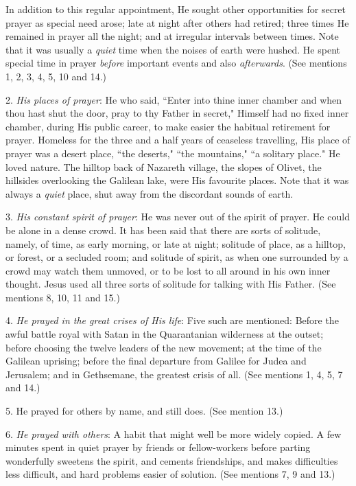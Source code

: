 In addition to this regular appointment, He sought other opportunities for
secret prayer as special need arose; late at night after others had
retired; three times He remained in prayer all the night; and at irregular
intervals between times. Note that it was usually a \textit{quiet} time when the
noises of earth were hushed. He spent special time in prayer \textit{before}
important events and also \textit{afterwards}. (See mentions 1, 2, 3, 4, 5, 10
and 14.)

2. \textit{His places of prayer}: He who said, ``Enter into thine inner chamber
and when thou hast shut the door, pray to thy Father in secret," Himself
had no fixed inner chamber, during His public career, to make easier the
habitual retirement for prayer. Homeless for the three and a half years of
ceaseless travelling, His place of prayer was a desert place, ``the
deserts," ``the mountains," ``a solitary place." He loved nature. The
hilltop back of Nazareth village, the slopes of Olivet, the hillsides
overlooking the Galilean lake, were His favourite places. Note that it was
always a \textit{quiet} place, shut away from the discordant sounds of earth.

3. \textit{His constant spirit of prayer}: He was never out of the spirit of
prayer. He could be alone in a dense crowd. It has been said that there
are sorts of solitude, namely, of time, as early morning, or late at
night; solitude of place, as a hilltop, or forest, or a secluded room; and
solitude of spirit, as when one surrounded by a crowd may watch them
unmoved, or to be lost to all around in his own inner thought. Jesus used
all three sorts of solitude for talking with His Father. (See mentions 8,
10, 11 and 15.)

4. \textit{He prayed in the great crises of His life}: Five such are mentioned:
Before the awful battle royal with Satan in the Quarantanian wilderness at
the outset; before choosing the twelve leaders of the new movement; at the
time of the Galilean uprising; before the final departure from Galilee for
Judea and Jerusalem; and in Gethsemane, the greatest crisis of all. (See
mentions 1, 4, 5, 7 and 14.)

5. He prayed for others by name, and still does. (See mention 13.)

6. \textit{He prayed with others}: A habit that might well be more widely copied.
A few minutes spent in quiet prayer by friends or fellow-workers before
parting wonderfully sweetens the spirit, and cements friendships, and
makes difficulties less difficult, and hard problems easier of solution.
(See mentions 7, 9 and 13.)

